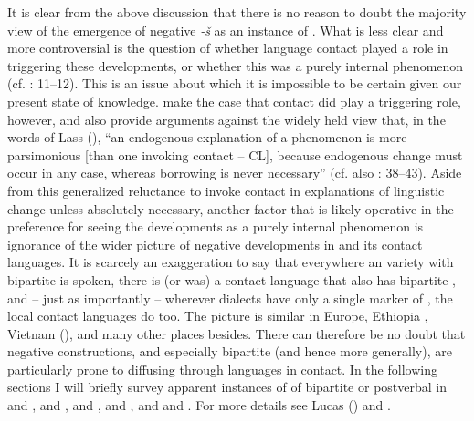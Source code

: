 \documentclass[output=paper]{langsci/langscibook}
\begin{document}
It is clear from the above discussion that there is no reason to doubt the majority view of the emergence of negative \textit{{}-š} as an instance of . What is less clear and more controversial is the question of whether language contact played a role in triggering these developments, or whether this was a purely internal phenomenon (cf. \citealt{Diem2014}: 11–12). This is an issue about which it is impossible to be certain given our present state of knowledge. \citet{LucasLash2010} make the case that contact did play a triggering role, however, and also provide arguments against the widely held view that, in the words of Lass (\citeyear[209]{Lass1997}), “an endogenous explanation of a phenomenon is more parsimonious [than one invoking contact – CL], because endogenous change must occur in any case, whereas borrowing is never necessary” (cf. also \citealt{Lucas2009}: 38–43). Aside from this generalized reluctance to invoke contact in explanations of linguistic change unless absolutely necessary, another factor that is likely operative in the preference for seeing the  developments as a purely internal phenomenon is ignorance of the wider picture of negative developments in  and its contact languages. It is scarcely an exaggeration to say that everywhere an  variety with bipartite  is spoken, there is (or was) a contact language that also has bipartite , and – just as importantly – wherever  dialects have only a single marker of , the local contact languages do too. The picture is similar in Europe, Ethiopia \citep{Lucas2009}, Vietnam (\citealt{AuweraVossen2015}), and many other places besides. There can therefore be no doubt that negative constructions, and especially bipartite  (and hence  more generally), are particularly prone to diffusing through languages in contact. In the following sections I will briefly survey apparent instances of  of bipartite or postverbal  in  and ,  and ,  and ,  and , and  and . For more details see Lucas (\citeyear{Lucas2007,Lucas2009,Lucas2013}) and \citet{LucasLash2010}.
\end{document}
